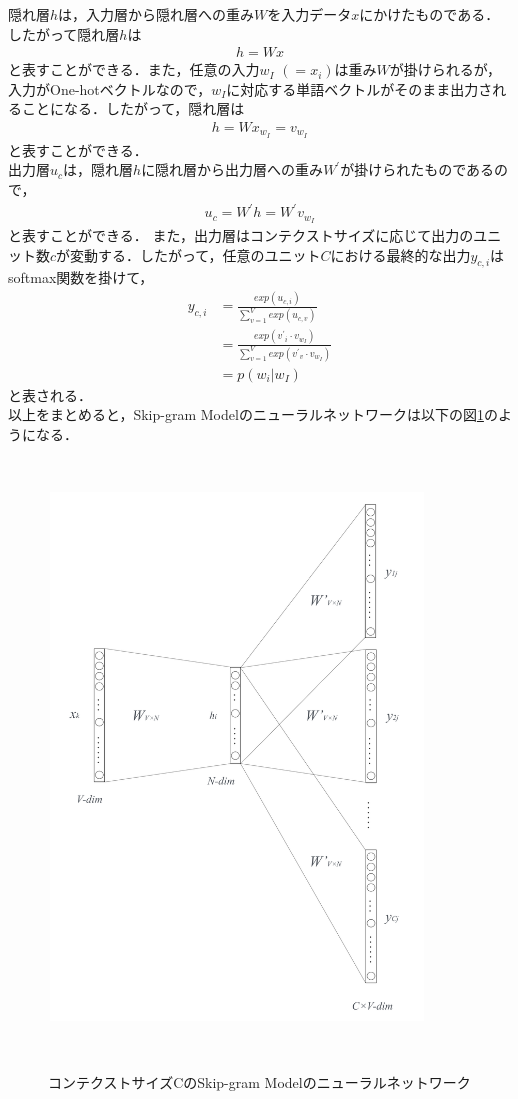 隠れ層$ h $は，入力層から隠れ層への重み$ W $を入力データ$ x $にかけたものである．したがって隠れ層$ h $は
\begin{align}
h = Wx \nonumber
\end{align}
と表すことができる．また，任意の入力$ w_{I} $ $ (= x_{i}) $は重み$ W $が掛けられるが，入力がOne-hotベクトルなので，$ w_{I} $に対応する単語ベクトルがそのまま出力されることになる．したがって，隠れ層は
\begin{align}
h = Wx_{w_{I}} = v_{w_{I}} \nonumber
\end{align}
と表すことができる．\\
出力層$ u_{c} $は，隠れ層$ h $に隠れ層から出力層への重み$ W^{\prime} $が掛けられたものであるので，
\begin{align}
u_{c} = W^{\prime}h = W^{\prime}v_{w_{I}} \nonumber
\end{align}
と表すことができる．
また，出力層はコンテクストサイズに応じて出力のユニット数$ c $が変動する．したがって，任意のユニット$ C $における最終的な出力$ y_{c,i} $はsoftmax関数を掛けて，
\begin{align}
y_{c,i} &= \frac{exp(u_{c,i})}{\sum_{v=1}^{V}exp(u_{c,v})} \nonumber \\
        &= \frac{exp({v^{\prime}}_{i} \cdot v_{w_{I}})}{\sum_{v=1}^{V}exp({v^{\prime}}_{v} \cdot v_{w_{I}})} \nonumber \\
        &= p(w_{i}|w_{I}) \nonumber
\end{align}
と表される．\\
以上をまとめると，Skip-gram Modelのニューラルネットワークは以下の図\ref{fig:neuralnet}のようになる．
\begin{figure}[htbp]
　\begin{center}
   \includegraphics[width=100mm,height=140mm]{figures/skip-gram.pdf}
   \caption{コンテクストサイズCのSkip-gram Modelのニューラルネットワーク}
   \label{fig:neuralnet}
　\end{center}
\end{figure}

